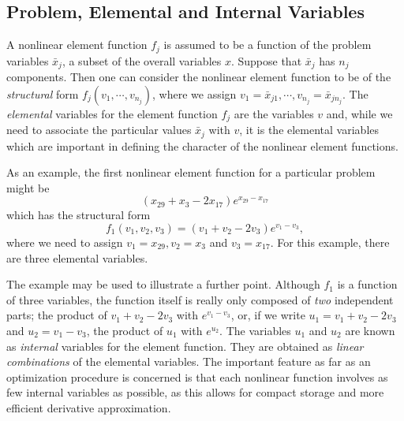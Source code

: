 \documentclass[a4paper]{article}
\newcommand{\beqn}[1]{\begin{equation}\label{#1}}
\newcommand{\eeqn}{\end{equation}}
\begin{document}
\subsection{\label{S1.2}Problem, Elemental and Internal Variables}

A nonlinear element function $f_j$
is assumed  to be a function of the
problem variables $\bar{x}_j$, a  subset of the overall variables $x$.
Suppose that $\bar{x}_j$ has  $n_j$ components.  Then one can consider
the nonlinear element function
to be of the {\em structural} form $f_j
(v_1,\cdots,v_{n_j})$, where   we assign  $v_1  = \bar{x}_{j1},\cdots,
v_{n_j} =  \bar{x}_{jn_{j}}$.  The {\em  elemental} variables
for the element  function $f_j$ are  the variables  $v$  and, while we
need to associate  the particular values  $\bar{x}_j$ with $v$,  it is
the elemental variables which are important in defining  the character
of the nonlinear element functions.

As an example,  the first nonlinear element  function
for a particular problem might be
\beqn{1.2.1}
(x_{29} + x_3 - 2x_{17})e^{x_{29} - x_{17}}
\eeqn
which has the structural form
\beqn{1.2.2}
f_1 (v_1, v_2, v_3) = (v_1 + v_2 - 2v_3) e^{v_{1} - v_{3}},
\eeqn
where we need to assign $v_1 = x_{29}, v_2 =  x_3$ and $v_3 = x_{17}$.
For this example, there are three elemental variables.

The example may be used to illustrate a  further point. Although $f_1$
is a function of  three variables, the  function itself is really only
composed of {\em two} independent parts; the product of $v_1 + v_2 - 2
v_3$ with $e^{v_1 - v_3}$, or, if we write $u_1 = v_1  +  v_2 - 2 v_3$
and $u_2 =  v_1 - v_3$,   the product  of  $u_1$  with $e^{u_2}$.  The
variables $u_1$ and $u_2$ are known  as {\em  internal} variables
for   the   element  function.   They  are obtained   as  {\em  linear
combinations}  of the elemental  variables.   The important feature as
far as an optimization procedure is concerned  is that  each nonlinear
function  involves  as  few internal  variables  as possible,  as this
allows  for   compact    storage   and  more  efficient     derivative
approximation.
\end{document}
